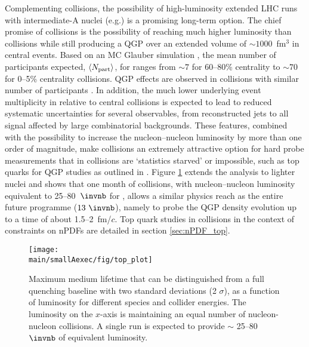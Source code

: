 Complementing \PbPb collisions, 
the possibility of high-luminosity extended LHC runs with intermediate-A nuclei (e.g.\ArAr)
is a promising long-term option.
The chief promise of \ArAr collisions is the possibility of reaching much higher luminosity than \PbPb collisions while still producing a QGP over an extended volume of $\sim 1000$~fm$^3$ in central events. Based on an MC Glauber simulation \cite{Loizides:2017ack}, the mean number of participants expected, $\langle N_{\rm part}\rangle$, for \ArAr ranges from  $\sim 7$ for 60--80\% centrality to $\sim 70$ for 0--5\% centrality collisions.  
QGP effects are observed in \PbPb collisions with similar number of participants \cite{Sirunyan:2018eqi, ATLAS-CONF-2018-007}.  In addition, the much lower underlying event multiplicity in \ArAr relative to central \PbPb collisions is expected to lead to reduced  systematic uncertainties for several observables, from reconstructed jets to all signal affected by large combinatorial backgrounds.  These features, combined with the possibility to increase the nucleon--nucleon luminosity by more than one order of magnitude, make \ArAr collisions an extremely attractive option for hard probe measurements that in \PbPb collisions are `statistics starved' or impossible, such as top quarks for QGP studies as outlined in \cite{Apolinario:2017sob}.  Figure \ref{fig:boosted_tops} extends the analysis to lighter nuclei and shows that one month of \ArAr collisions, with nucleon--nucleon luminosity equivalent to 25--80~$\invnb$ for \PbPb, allows a similar physics reach as the entire \PbPb future programme ($13~\invnb$), namely to probe the QGP density evolution up to a time of about 1.5--2~fm/$c$.  Top quark studies in \ArAr collisions in the context of constraints on nPDFs are detailed in section \ref{sec:nPDF_top}.
\begin{figure}
\centering
\texttt{[image: \\main/smallAexec/fig/top\_plot]}
\caption{Maximum medium lifetime that can be distinguished from a full quenching baseline with two standard deviations (2 $\sigma$), as a function of luminosity for different species and collider energies. The luminosity on the $x$-axis is maintaining an equal number of nucleon-nucleon collisions. A single \ArAr run is expected to provide $\sim$ 25--80 $\invnb$ of \PbPb equivalent luminosity.}
\label{fig:boosted_tops}
\end{figure}

